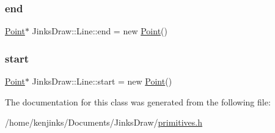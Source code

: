 \subsubsection{\texorpdfstring{end}{end}}
{\footnotesize\ttfamily \mbox{\hyperlink{class_jinks_draw_1_1_point}{Point}}$\ast$ Jinks\+Draw\+::\+Line\+::end = new \mbox{\hyperlink{class_jinks_draw_1_1_point}{Point}}()\hspace{0.3cm}{\ttfamily [private]}}

\mbox{\label{class_jinks_draw_1_1_line_a697fccb64f32b900f86dbc89ac69fec3}} 
\subsubsection{\texorpdfstring{start}{start}}
{\footnotesize\ttfamily \mbox{\hyperlink{class_jinks_draw_1_1_point}{Point}}$\ast$ Jinks\+Draw\+::\+Line\+::start = new \mbox{\hyperlink{class_jinks_draw_1_1_point}{Point}}()\hspace{0.3cm}{\ttfamily [private]}}



The documentation for this class was generated from the following file\+:\begin{DoxyCompactItemize}
\item 
/home/kenjinks/\+Documents/\+Jinks\+Draw/\mbox{\hyperlink{primitives_8h}{primitives.\+h}}\end{DoxyCompactItemize}
